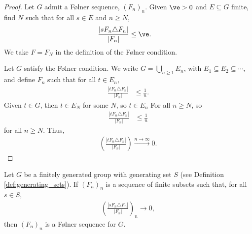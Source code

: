 \begin{proof}
  Let $G$ admit a Følner sequence, $\left(F_n\right)_n$. Given $\ve > 0$ and $E\subseteq G$ finite, find $N$ such that for all $s\in E$ and $n\geq N$,
  \begin{align*}
    \frac{\left\vert sF_n\triangle F_n \right\vert}{\left\vert F_n \right\vert} &\leq \ve.
  \end{align*}
  We take $F = F_N$ in the definition of the Følner condition.\newline

  Let $G$ satisfy the Følner condition. We write $G = \bigcup_{n\geq 1}E_n$, with $E_1\subseteq E_2\subseteq \cdots$, and define $F_n$ such that for all $t\in E_n$,
  \begin{align*}
    \frac{\left\vert tF_n\triangle F_n \right\vert}{\left\vert F_n \right\vert} &\leq \frac{1}{n}.
  \end{align*}
  Given $t\in G$, then $t\in E_N$ for some $N$, so $t\in E_n$ For all $n\geq N$, so
  \begin{align*}
    \frac{\left\vert tF_n\triangle F_n \right\vert}{\left\vert F_n \right\vert} &\leq \frac{1}{n}
  \end{align*}
  for all $n\geq N$. Thus,
  \begin{align*}
    \left(\frac{\left\vert tF_n\triangle F_n \right\vert}{\left\vert F_n \right\vert}\right)\xrightarrow{n\rightarrow\infty}0.
  \end{align*}
\end{proof}
\begin{lemma}
  Let $G$ be a finitely generated group with generating set $S$ (see Definition \ref{def:generating_sets}). If $\left(F_n\right)_n$ is a sequence of finite subsets such that, for all $s\in S$,
  \begin{align*}
    \left(\frac{\left\vert sF_n\triangle F_n \right\vert}{\left\vert F_n \right\vert}\right)_n\rightarrow 0,
  \end{align*}
  then $\left(F_n\right)_n$ is a Følner sequence for $G$.
\end{lemma}

